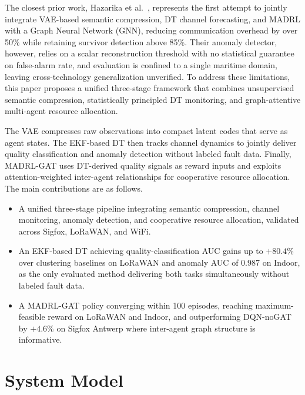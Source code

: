 \documentclass[conference]{IEEEtran}
\begin{document}
The closest prior work, Hazarika et al.~\cite{ref_semadt}, represents the first attempt to jointly integrate VAE-based semantic compression, DT channel forecasting, and MADRL with a Graph Neural Network (GNN), reducing communication overhead by over 50\% while retaining survivor detection above 85\%. Their anomaly detector, however, relies on a scalar reconstruction threshold with no statistical guarantee on false-alarm rate, and evaluation is confined to a single maritime domain, leaving cross-technology generalization unverified.
To address these limitations, this paper proposes a unified three-stage framework that combines unsupervised semantic compression, statistically principled DT monitoring, and graph-attentive multi-agent resource allocation.

The VAE compresses raw observations into compact latent codes that serve as agent states. The EKF-based DT then tracks channel dynamics to jointly deliver quality classification and anomaly detection without labeled fault data. Finally, MADRL-GAT uses DT-derived quality signals as reward inputs and exploits attention-weighted inter-agent relationships for cooperative resource allocation.
The main contributions are as follows.
\begin{itemize}
\setlength{\itemsep}{0pt}\setlength{\parsep}{0pt}
\item A unified three-stage pipeline integrating semantic compression, channel monitoring, anomaly detection, and cooperative resource allocation, validated across Sigfox, LoRaWAN, and WiFi.
\item An EKF-based DT achieving quality-classification AUC gains up to $+80.4\%$ over clustering baselines on LoRaWAN and anomaly AUC of 0.987 on Indoor, as the only evaluated method delivering both tasks simultaneously without labeled fault data.
\item A MADRL-GAT policy converging within 100 episodes, reaching maximum-feasible reward on LoRaWAN and Indoor, and outperforming DQN-noGAT by $+4.6\%$ on Sigfox Antwerp where inter-agent graph structure is informative.
\end{itemize}


\vspace{-8pt}
\section{System Model}
\label{sec:model}

\vspace{-7pt}
\end{document}
